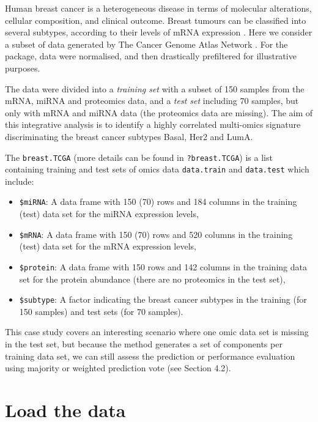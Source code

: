\documentclass[]{book}
\providecommand{\tightlist}{%
  \setlength{\itemsep}{0pt}\setlength{\parskip}{0pt}}
\begin{document}
Human breast cancer is a heterogeneous disease in terms of molecular
alterations, cellular composition, and clinical outcome. Breast tumours
can be classified into several subtypes, according to their levels of
mRNA expression \citep{Sor01}. Here we consider a subset of data
generated by The Cancer Genome Atlas Network \citep{TCGA12}. For the
package, data were normalised, and then drastically prefiltered for
illustrative purposes.

The data were divided into a \emph{training set} with a subset of 150
samples from the mRNA, miRNA and proteomics data, and a \emph{test set}
including 70 samples, but only with mRNA and miRNA data (the proteomics
data are missing). The aim of this integrative analysis is to identify a
highly correlated multi-omics signature discriminating the breast cancer
subtypes Basal, Her2 and LumA.

The \texttt{breast.TCGA} (more details can be found in
\texttt{?breast.TCGA}) is a list containing training and test sets of
omics data \texttt{data.train} and \texttt{data.test} which include:

\begin{itemize}
\tightlist
\item
  \texttt{\$miRNA}: A data frame with 150 (70) rows and 184 columns in
  the training (test) data set for the miRNA expression levels,
\item
  \texttt{\$mRNA}: A data frame with 150 (70) rows and 520 columns in
  the training (test) data set for the mRNA expression levels,
\item
  \texttt{\$protein}: A data frame with 150 rows and 142 columns in the
  training data set for the protein abundance (there are no proteomics
  in the test set),
\item
  \texttt{\$subtype}: A factor indicating the breast cancer subtypes in
  the training (for 150 samples) and test sets (for 70 samples).
\end{itemize}

This case study covers an interesting scenario where one omic data set
is missing in the test set, but because the method generates a set of
components per training data set, we can still assess the prediction or
performance evaluation using majority or weighted prediction vote (see
Section 4.2).

\section{Load the data}\label{diablo:load}
\end{document}
